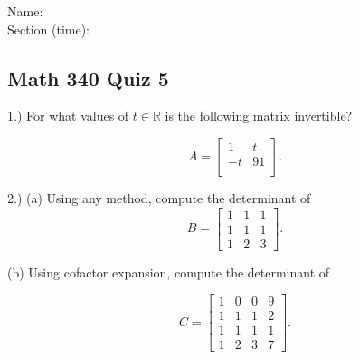 \documentclass{article}
\begin{document}
Name:\\
\medskip
Section (time):

\subsection*{Math 340 Quiz 5}
1.) For what values of $t\in\mathbb{R}$ is the following matrix invertible?

$$A=\left[\begin{array}{cc}
1 & t\\
-t & 91\\
\end{array}\right].$$


2.) (a) Using any method, compute the determinant of 
$$B=\left[\begin{array}{ccc}
1 & 1 & 1\\
1 & 1 & 1\\
1 & 2 & 3 
\end{array}\right].$$

(b) Using cofactor expansion, compute the determinant of 

$$C=\left[\begin{array}{cccc}
1 & 0 & 0 & 9\\
1 & 1 & 1 & 2\\
1 & 1 & 1 & 1\\
1 & 2 & 3 & 7
\end{array}\right].$$
\medskip
\end{document}
